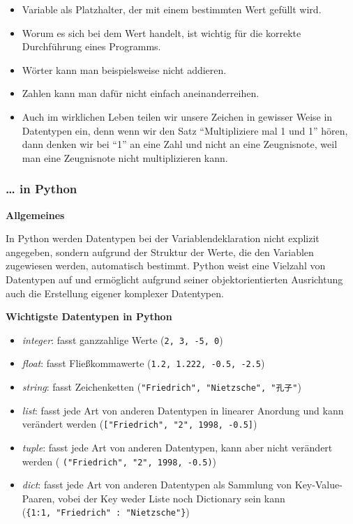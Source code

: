 \begin{itemize}
\itemsep1pt\parskip0pt
\item
  {Variable als Platzhalter, der mit einem bestimmten Wert gefüllt
  wird.}
\item
  {Worum es sich bei dem Wert handelt, ist wichtig für die korrekte
  Durchführung eines Programms.}
\item
  {Wörter kann man beispielsweise nicht addieren.}
\item
  {Zahlen kann man dafür nicht einfach aneinanderreihen.}
\item
  {Auch im wirklichen Leben teilen wir unsere Zeichen in gewisser Weise
  in Datentypen ein, denn wenn wir den Satz ``Multipliziere mal 1 und
  1'' hören, dann denken wir bei ``1'' an eine Zahl und nicht an eine
  Zeugnisnote, weil man eine Zeugnisnote nicht multiplizieren kann.}
\end{itemize}


\subsubsection{\texorpdfstring{{\ldots{} in
Python}}{\ldots{} in Python}}

\vspace{0.5cm}\par\noindent\textbf{Allgemeines}\vspace{0.5cm}

In Python werden Datentypen bei der Variablendeklaration nicht explizit
angegeben, sondern aufgrund der Struktur der Werte, die den Variablen
zugewiesen werden, automatisch bestimmt. Python weist eine Vielzahl von
Datentypen auf und ermöglicht aufgrund seiner objektorientierten
Ausrichtung auch die Erstellung eigener komplexer Datentypen.



\vspace{0.5cm}\par\noindent\textbf{Wichtigste Datentypen in Python}\vspace{0.5cm}

\begin{itemize}
\itemsep1pt\parskip0pt
\item
  {\emph{integer}: fasst ganzzahlige Werte (\texttt{2,\ 3,\ -5,\ 0})}
\item
  {\emph{float}: fasst Fließkommawerte
  (\texttt{1.2,\ 1.222,\ -0.5,\ -2.5})}
\item
  {\emph{string}: fasst Zeichenketten
  (\texttt{"Friedrich",\ "Nietzsche",\ "孔子"})}
\item
  {\emph{list}: fasst jede Art von anderen Datentypen in linearer
  Anordung und kann verändert werden
  (\texttt{{[}"Friedrich",\ "2",\ 1998,\ -0.5{]}})}
\item
  {\emph{tuple}: fasst jede Art von anderen Datentypen, kann aber nicht
  verändert werden ( \texttt{("Friedrich",\ "2",\ 1998,\ -0.5)})}
\item
  {\emph{dict}: fasst jede Art von anderen Datentypen als Sammlung von
  Key-Value-Paaren, vobei der Key weder Liste noch Dictionary sein kann
  (\texttt{\{1:1,\ "Friedrich"\ :\ "Nietzsche"\}})}
\end{itemize}




